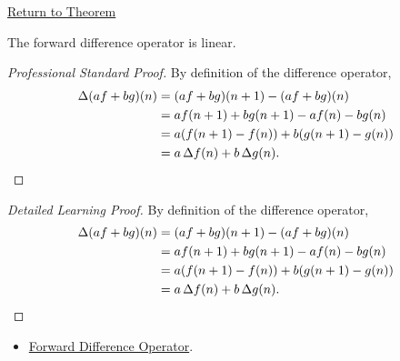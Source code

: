 \newpage
{}
\label{prf:delta-linearity}

\begin{remark*}[Return]
\hyperref[prop:delta-linearity]{Return to Theorem}
\end{remark*}

\begin{proposition*}
The forward difference operator is linear.
\end{proposition*}

\begin{proof}[Professional Standard Proof]
\LRAProofBodyStart
By definition of the difference operator,
\[
\begin{aligned}
\Delta (a f + b g)(n)
&= (a f + b g)(n+1) - (a f + b g)(n) \\
&= a f(n+1) + b g(n+1) - a f(n) - b g(n) \\
&= a(f(n+1)-f(n)) + b(g(n+1)-g(n)) \\
&= a\,\Delta f(n) + b\,\Delta g(n). \qedhere
\end{aligned}
\]
\end{proof}

\begin{proof}[Detailed Learning Proof]
\LRAProofBodyStart
By definition of the difference operator,
\[
\begin{aligned}
\Delta (a f + b g)(n)
&= (a f + b g)(n+1) - (a f + b g)(n) \\
&= a f(n+1) + b g(n+1) - a f(n) - b g(n) \\
&= a(f(n+1)-f(n)) + b(g(n+1)-g(n)) \\
&= a\,\Delta f(n) + b\,\Delta g(n). \qedhere
\end{aligned}
\]
\end{proof}

\begin{remark*}
\end{remark*}

\begin{dependencies}
\begin{itemize}
  \item \hyperref[def:forward-difference]{Forward Difference Operator}.
\end{itemize}
\end{dependencies}
\clearpage
